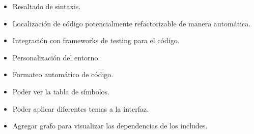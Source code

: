 \documentclass[a4paper,oneside,10pt]{article}
\begin{document}
\begin{itemize}
	\item Resaltado de sintaxis.
	\item Localizaci\'on de c\'odigo potencialmente refactorizable de manera autom\'atica.
	\item Integraci\'on con frameworks de testing para el c\'odigo.
	\item Personalizaci\'on del entorno.
	\item Formateo autom\'atico de c\'odigo.
  \item Poder ver la tabla de símbolos.
  \item Poder aplicar diferentes temas a la interfaz.
  \item Agregar grafo para visualizar las dependencias de los includes.
\end{itemize}
\end{document}
